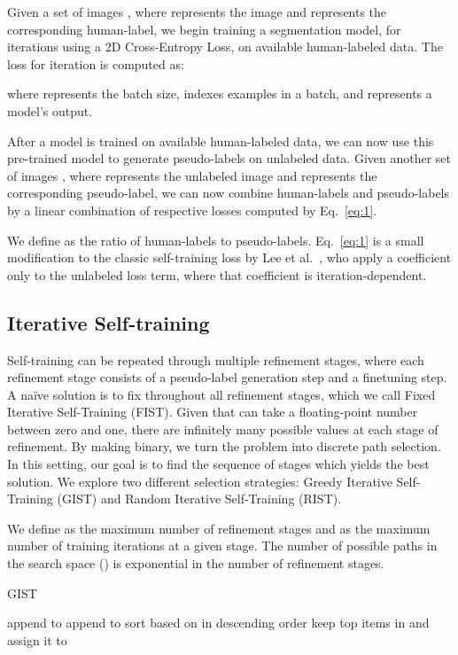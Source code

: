 \documentclass[10pt, conference, compsocconf]{IEEEtran}
\begin{document}
Given a set of images , where  represents the image and  represents the corresponding human-label, we begin training a segmentation model,  for  iterations using a 2D Cross-Entropy Loss,  on available human-labeled data. The loss for iteration  is computed as:

\noindent where  represents the batch size,  indexes examples in a batch, and  represents a model's output.

After a model is trained on available human-labeled data, we can now use this pre-trained model to generate pseudo-labels on unlabeled data.
Given another set of images , where  represents the unlabeled image and  represents the corresponding pseudo-label, we can now combine human-labels and pseudo-labels by a linear combination of respective losses computed by Eq.~\ref{eq:1}.


We define  as the ratio of human-labels to pseudo-labels.
Eq.~\ref{eq:1} is a small modification to the classic self-training loss by Lee et al.~\cite{lee2013pseudo},
who apply a coefficient only to the unlabeled loss term, where that coefficient is iteration-dependent.

\subsection{Iterative Self-training}\label{sec2}

Self-training can be repeated through multiple refinement stages, where each refinement stage consists of a pseudo-label generation step and a finetuning step. A na\"ive solution is to fix  throughout all refinement stages,
which we call
Fixed Iterative Self-Training (FIST).
Given that  can take a floating-point number between zero and one, there are infinitely many possible  values at each stage of refinement. By making  binary, we turn the problem into discrete path selection. In this setting, our goal is to find the sequence of stages which yields the best solution. We explore two different selection strategies:  Greedy Iterative Self-Training (GIST) and Random Iterative Self-Training (RIST).




We define  as the maximum number of refinement stages and  as the maximum number of training iterations at a given stage. The number of possible paths in the search space () is exponential in the number of refinement stages.

\begin{algorithm}[h]
   \caption{GIST}
         \label{alg:GIST}
    \begin{algorithmic}[1]
    \scriptsize
    \STATE 
\FOR{ }
\STATE 
\FOR{}
\FOR{}
\STATE 
                \ENDFOR

                    \STATE 
                    \STATE 
                \ENDFOR
\STATE append  to 
                \STATE append  to 
            \ENDFOR
        \ENDFOR
        \STATE sort  based on  in descending order
        \STATE keep top  items in  and assign it to 
    \ENDFOR
\end{algorithmic}
\end{algorithm}
\end{document}
